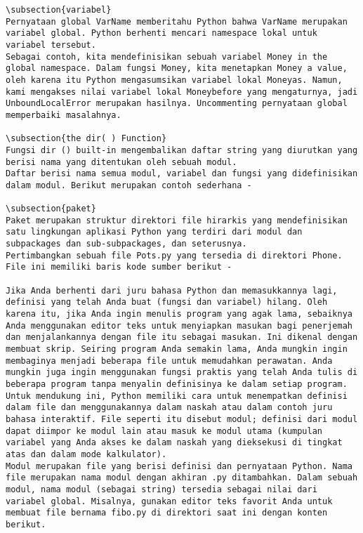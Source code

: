 \begin{verbatim}
\subsection{variabel}
Pernyataan global VarName memberitahu Python bahwa VarName merupakan variabel global. Python berhenti mencari namespace lokal untuk variabel tersebut. 
Sebagai contoh, kita mendefinisikan sebuah variabel Money in the global namespace. Dalam fungsi Money, kita menetapkan Money a value, oleh karena itu Python mengasumsikan variabel lokal Moneyas. Namun, kami mengakses nilai variabel lokal Moneybefore yang mengaturnya, jadi UnboundLocalError merupakan hasilnya. Uncommenting pernyataan global memperbaiki masalahnya.
 
\subsection{the dir( ) Function}
Fungsi dir () built-in mengembalikan daftar string yang diurutkan yang berisi nama yang ditentukan oleh sebuah modul.
Daftar berisi nama semua modul, variabel dan fungsi yang didefinisikan dalam modul. Berikut merupakan contoh sederhana - 

\subsection{paket}
Paket merupakan struktur direktori file hirarkis yang mendefinisikan satu lingkungan aplikasi Python yang terdiri dari modul dan subpackages dan sub-subpackages, dan seterusnya.
Pertimbangkan sebuah file Pots.py yang tersedia di direktori Phone. File ini memiliki baris kode sumber berikut -

Jika Anda berhenti dari juru bahasa Python dan memasukkannya lagi, definisi yang telah Anda buat (fungsi dan variabel) hilang. Oleh karena itu, jika Anda ingin menulis program yang agak lama, sebaiknya Anda menggunakan editor teks untuk menyiapkan masukan bagi penerjemah dan menjalankannya dengan file itu sebagai masukan. Ini dikenal dengan membuat skrip. Seiring program Anda semakin lama, Anda mungkin ingin membaginya menjadi beberapa file untuk memudahkan perawatan. Anda mungkin juga ingin menggunakan fungsi praktis yang telah Anda tulis di beberapa program tanpa menyalin definisinya ke dalam setiap program.
Untuk mendukung ini, Python memiliki cara untuk menempatkan definisi dalam file dan menggunakannya dalam naskah atau dalam contoh juru bahasa interaktif. File seperti itu disebut modul; definisi dari modul dapat diimpor ke modul lain atau masuk ke modul utama (kumpulan variabel yang Anda akses ke dalam naskah yang dieksekusi di tingkat atas dan dalam mode kalkulator).
Modul merupakan file yang berisi definisi dan pernyataan Python. Nama file merupakan nama modul dengan akhiran .py ditambahkan. Dalam sebuah modul, nama modul (sebagai string) tersedia sebagai nilai dari variabel global. Misalnya, gunakan editor teks favorit Anda untuk membuat file bernama fibo.py di direktori saat ini dengan konten berikut. 


\end{verbatim}
